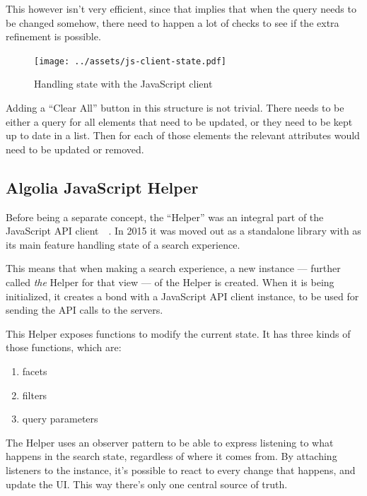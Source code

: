 This however isn't very efficient, since that implies that when the query needs to be changed somehow, there need to happen a lot of checks to see if the extra refinement is possible.

\begin{figure}[H]
\label{figure:js-client-state}
  \centering
  \texttt{[image: ../assets/js-client-state.pdf]}
  \caption{Handling state with the JavaScript client}
\end{figure}

Adding a ``Clear All'' button in this structure is not trivial. There needs to be either a query for all elements that need to be updated, or they need to be kept up to date in a list. Then for each of those elements the relevant attributes would need to be updated or removed.


\subsection{Algolia JavaScript Helper} %
\label{sub:algolia_js_helper}

Before being a separate concept, the ``Helper'' was an integral part of the JavaScript API client~\cite{algolia-blog-js-client}~. In 2015 it was moved out as a standalone library with as its main feature handling state of a search experience.

This means that when making a search experience, a new instance --- further called \emph{the} Helper for that view --- of the Helper is created. When it is being initialized, it creates a bond with a JavaScript API client instance, to be used for sending the API calls to the servers.

This Helper exposes functions to modify the current state. It has three kinds of those functions, which are:

\begin{enumerate}
  \item facets
  \item filters
  \item query parameters
\end{enumerate}

The Helper uses an observer pattern to be able to express listening to what happens in the search state, regardless of where it comes from. By attaching listeners to the instance, it's possible to react to every change that happens, and update the UI. This way there's only one central source of truth.

